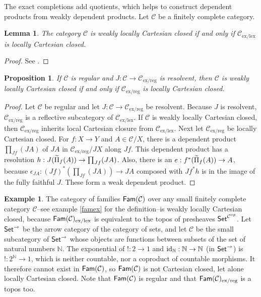 \documentclass[sort&compress]{elsarticle}
\theoremstyle{plain}
\newtheorem{lemma}[theorem]{Lemma}
\newtheorem{prop}[theorem]{Proposition}
\theoremstyle{definition}
\newtheorem{example}[theorem]{Example}
\theoremstyle{remark}
\newcommand\cat\mathcal
\newcommand\exlex{_\mathrm{ex/lex}}
\newcommand\exreg{_\mathrm{ex/reg}}
\begin{document}
The exact completions add quotients, which helps to construct dependent products from weakly dependent products. Let $\cat C$ be a finitely complete category.

\begin{lemma} The category $\cat C$ is weakly locally Cartesian closed if and only if $\cat C\exlex$ is locally Cartesian closed. \end{lemma}

\begin{proof} See \citet{MR1787592}. \end{proof}

\begin{prop} 
If $\cat C$ is regular and $J:\cat C\to\cat C\exreg$ is resolvent, then $\cat C$ is weakly locally Cartesian closed if and only if $\cat C\exreg$ is locally Cartesian closed. \label{lccc}
\end{prop}

\begin{proof} Let $\cat C$ be regular and let $J:\cat C\to\cat C\exreg$ be resolvent. Because $J$ is resolvent, $\cat C\exreg$ is a reflective subcategory of $\cat C\exlex$. If $\cat C$ is weakly locally Cartesian closed, then $\cat C\exreg$ inherits local Cartesian closure from $\cat C\exlex$. Next let $\cat C\exreg$ be locally Cartesian closed. For $f:X\to Y$ and $A\in \cat C/X$, there is a dependent product $\prod_{Jf}(JA)$ of $JA$ in $\cat C\exreg/JX$ along $Jf$. This dependent product has a resolution $h:J(\widetilde{\Pi}_f(A)) \to \prod_{Jf}(JA)$. Also, there is an $e:f^*(\widetilde{\Pi}_f(A)) \to A$, because $\epsilon_{JA}:(Jf)^*(\prod_{Jf}(JA)) \to JA$ composed with $Jf^*h$ is in the image of the fully faithful $J$. These form a weak dependent product. \end{proof}


\newcommand\N{\mathbb N}

\begin{example} The category of families $\Fam(\cat C)$ over any small finitely complete category $\cat C$--see example \ref{famex} for the definition--is weakly locally Cartesian closed, because $\Fam(\cat C)\exlex$ is equivalent to the topos of presheaves $\Set^{\cat C\dual}$. Let $\mathsf{Set}^\to$ be the arrow category of the category of sets, and let $\cat C$ be the small subcategory of $\mathsf{Set}^\to$ whose objects are functions between subsets of the set of natural numbers $\N$.  The exponential of $!:2\to 1$ and $\id_\N:\N\to\N$ (in $\mathsf{Set}^\to$) is $!:2^\N \to 1$, which is neither countable, nor a coproduct of countable morphisms. It therefore cannot exist in $\Fam(\cat C)$, so $\Fam(\cat C)$ is not Cartesian closed, let alone locally Cartesian closed. Note that $\Fam(\cat C)$ is regular and that $\Fam(\cat C)\exreg$ is a topos too. \end{example}%
\end{document}

